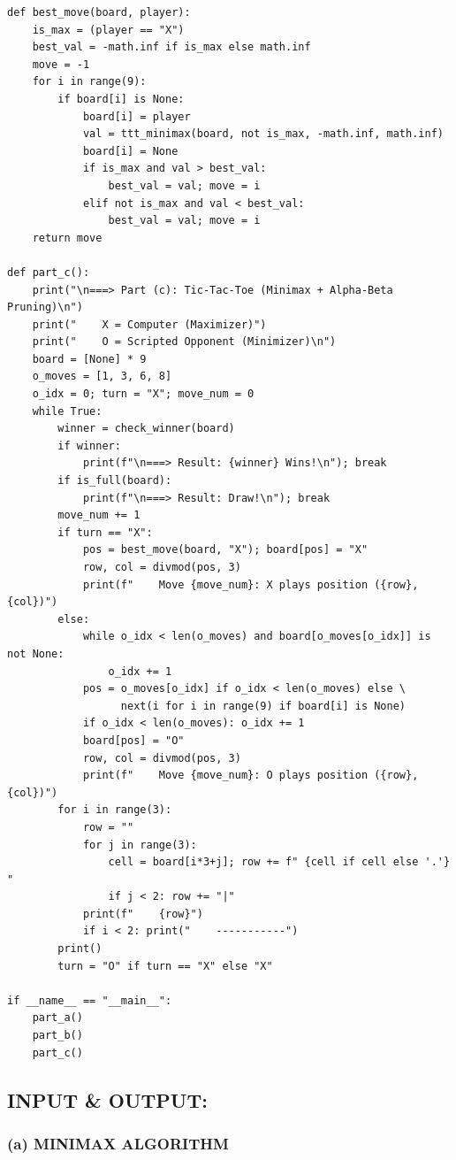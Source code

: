 \documentclass[12pt,a4paper]{article}
\begin{document}
\begin{lstlisting}
def best_move(board, player):
    is_max = (player == "X")
    best_val = -math.inf if is_max else math.inf
    move = -1
    for i in range(9):
        if board[i] is None:
            board[i] = player
            val = ttt_minimax(board, not is_max, -math.inf, math.inf)
            board[i] = None
            if is_max and val > best_val:
                best_val = val; move = i
            elif not is_max and val < best_val:
                best_val = val; move = i
    return move

def part_c():
    print("\n===> Part (c): Tic-Tac-Toe (Minimax + Alpha-Beta Pruning)\n")
    print("    X = Computer (Maximizer)")
    print("    O = Scripted Opponent (Minimizer)\n")
    board = [None] * 9
    o_moves = [1, 3, 6, 8]
    o_idx = 0; turn = "X"; move_num = 0
    while True:
        winner = check_winner(board)
        if winner:
            print(f"\n===> Result: {winner} Wins!\n"); break
        if is_full(board):
            print(f"\n===> Result: Draw!\n"); break
        move_num += 1
        if turn == "X":
            pos = best_move(board, "X"); board[pos] = "X"
            row, col = divmod(pos, 3)
            print(f"    Move {move_num}: X plays position ({row},{col})")
        else:
            while o_idx < len(o_moves) and board[o_moves[o_idx]] is not None:
                o_idx += 1
            pos = o_moves[o_idx] if o_idx < len(o_moves) else \
                  next(i for i in range(9) if board[i] is None)
            if o_idx < len(o_moves): o_idx += 1
            board[pos] = "O"
            row, col = divmod(pos, 3)
            print(f"    Move {move_num}: O plays position ({row},{col})")
        for i in range(3):
            row = ""
            for j in range(3):
                cell = board[i*3+j]; row += f" {cell if cell else '.'} "
                if j < 2: row += "|"
            print(f"    {row}")
            if i < 2: print("    -----------")
        print()
        turn = "O" if turn == "X" else "X"

if __name__ == "__main__":
    part_a()
    part_b()
    part_c()
\end{lstlisting}

\subsection{INPUT \& OUTPUT:}

\subsubsection*{(a) MINIMAX ALGORITHM}
\end{document}
